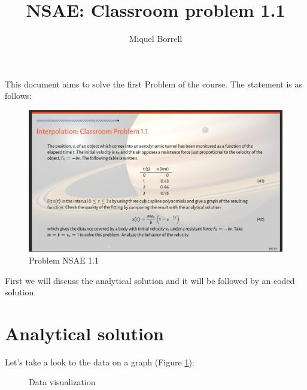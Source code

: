 \documentclass[]{article}
\title{NSAE: Classroom problem 1.1}
\author{Miquel Borrell}
\date{}
\begin{document}
\maketitle

This document aims to solve the first Problem of the course. The statement is as follows:

\begin{figure}[h]
	\includegraphics[width=\textwidth]{Problem.png}
	\caption{Problem NSAE 1.1}
\end{figure}

First we will discuss the analytical solution and it will be followed by an coded solution.

\section{Analytical solution}

Let's take a look to the data on a graph (Figure \ref{fig:data_points_graph}):
\begin{figure}[h]
    \centering

   \caption{Data visualization}
   \label{fig:data_points_graph}
\end{figure}
\end{document}
